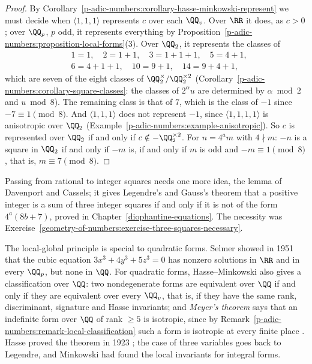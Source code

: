 \begin{proof}
By Corollary~\ref{p-adic-numbers:corollary-hasse-minkowski-represent} we must decide when $\langle 1, 1, 1\rangle$ represents $c$ over each $\QQ_v$. Over $\RR$ it does, as $c > 0$; over $\QQ_p$, $p$ odd, it represents
everything by Proposition~\ref{p-adic-numbers:proposition-local-forms}(3). Over $\QQ_2$, it represents the classes of
\[
\begin{aligned}
&1 = 1, \quad 2 = 1 + 1, \quad 3 = 1 + 1 + 1, \quad 5 = 4 + 1, \\
&6 = 4 + 1 + 1, \quad 10 = 9 + 1, \quad 14 = 9 + 4 + 1,
\end{aligned}
\]
which are seven of the eight classes of $\QQ_2^\times/\QQ_2^{\times2}$ (Corollary~\ref{p-adic-numbers:corollary-square-classes}: the classes of $2^\alpha u$ are determined by $\alpha \bmod 2$ and $u \bmod 8$). The
remaining class is that of $7$, which is the class of $-1$ since $-7 \equiv 1 \pmod 8$. And $\langle 1, 1, 1\rangle$ does not represent $-1$, since $\langle 1, 1, 1, 1\rangle$ is anisotropic over $\QQ_2$
(Example~\ref{p-adic-numbers:example-anisotropic}). So $c$ is represented over $\QQ_2$ if and only if $c \notin -\QQ_2^{\times2}$. For $n = 4^am$ with $4 \nmid m$: $-n$ is a square in $\QQ_2$ if and only if $-m$ is, if and
only if $m$ is odd and $-m \equiv 1 \pmod 8$, that is, $m \equiv 7 \pmod 8$.
\end{proof}

\begin{remark}\label{p-adic-numbers:remark-three-squares}
Passing from rational to integer squares needs one more idea, the lemma of Davenport and Cassels; it gives Legendre's and Gauss's theorem that a positive integer is a sum of three integer squares if and only if it is not of
the form $4^a(8b + 7)$, proved in Chapter~\ref{diophantine-equations}. The necessity was Exercise~\ref{geometry-of-numbers:exercise-three-squares-necessary}.
\end{remark}

\begin{remark}\label{p-adic-numbers:remark-hasse-principle}
The local-global principle is special to quadratic forms. Selmer showed in 1951 \cite{selmer-1951} that the cubic equation $3x^3 + 4y^3 + 5z^3 = 0$ has nonzero solutions in $\RR$ and in every $\QQ_p$, but none
in $\QQ$. For quadratic forms, Hasse--Minkowski also gives a classification over $\QQ$: two nondegenerate forms are equivalent over $\QQ$ if and only if they are equivalent over every $\QQ_v$, that is, if they have the
same rank, discriminant, signature and Hasse invariants; and \emph{Meyer's theorem} says that an indefinite form over $\QQ$ of rank $\geq 5$ is isotropic, since by Remark~\ref{p-adic-numbers:remark-local-classification}
such a form is isotropic at every finite place \cite[Chapter IV]{serre-arithmetic}. Hasse proved the theorem in 1923 \cite{hasse-1923}; the case of three variables goes back to Legendre, and Minkowski had found the local invariants for integral forms.
\end{remark}

